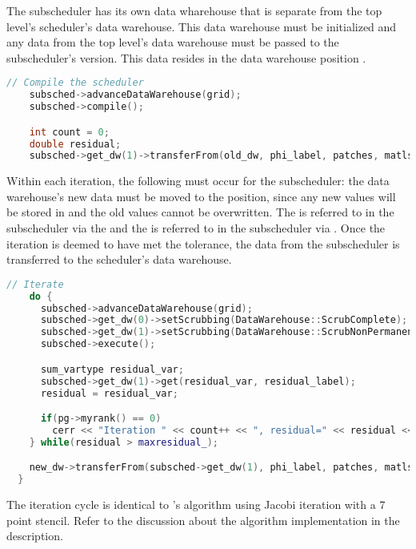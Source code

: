   The subscheduler has its own data wharehouse that is separate from the
  top level's scheduler's data warehouse.  This data warehouse must be
  initialized and any data from the top level's data warehouse must be
  passed to the subscheduler's version.  This data resides in the data
  warehouse position .

  \begin{lstlisting}[language=Cpp]
    // Compile the scheduler
    subsched->advanceDataWarehouse(grid);
    subsched->compile();

    int count = 0;
    double residual;
    subsched->get_dw(1)->transferFrom(old_dw, phi_label, patches, matls);
  \end{lstlisting}

  Within each iteration, the following must occur for the subscheduler:
  the data warehouse's new data must be moved to the 
  position, since any new values will be stored in  and
  the old values cannot be overwritten.  The  is referred
  to in the subscheduler via the  and the
   is referred to in the subscheduler via
  .  Once the iteration is deemed to have
  met the tolerance, the data from the subscheduler is transferred to
  the scheduler's data warehouse.

  \begin{lstlisting}[language=Cpp]
    // Iterate
    do {
      subsched->advanceDataWarehouse(grid);
      subsched->get_dw(0)->setScrubbing(DataWarehouse::ScrubComplete);
      subsched->get_dw(1)->setScrubbing(DataWarehouse::ScrubNonPermanent);
      subsched->execute();    

      sum_vartype residual_var;
      subsched->get_dw(1)->get(residual_var, residual_label);
      residual = residual_var;

      if(pg->myrank() == 0)
        cerr << "Iteration " << count++ << ", residual=" << residual << '\n';
    } while(residual > maxresidual_);

    new_dw->transferFrom(subsched->get_dw(1), phi_label, patches, matls);
  }

\end{lstlisting}

The iteration cycle is identical to 's
 algorithm using Jacobi iteration with a 7 point
stencil.  Refer to the discussion about the algorithm implementation
in the  description.

